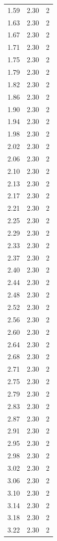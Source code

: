 \begin{longtable}{lrr}
  1.59 & 2.30 & 2 \\
  1.63 & 2.30 & 2 \\
  1.67 & 2.30 & 2 \\
  1.71 & 2.30 & 2 \\
  1.75 & 2.30 & 2 \\
  1.79 & 2.30 & 2 \\
  1.82 & 2.30 & 2 \\
  1.86 & 2.30 & 2 \\
  1.90 & 2.30 & 2 \\
  1.94 & 2.30 & 2 \\
  1.98 & 2.30 & 2 \\
  2.02 & 2.30 & 2 \\
  2.06 & 2.30 & 2 \\
  2.10 & 2.30 & 2 \\
  2.13 & 2.30 & 2 \\
  2.17 & 2.30 & 2 \\
  2.21 & 2.30 & 2 \\
  2.25 & 2.30 & 2 \\
  2.29 & 2.30 & 2 \\
  2.33 & 2.30 & 2 \\
  2.37 & 2.30 & 2 \\
  2.40 & 2.30 & 2 \\
  2.44 & 2.30 & 2 \\
  2.48 & 2.30 & 2 \\
  2.52 & 2.30 & 2 \\
  2.56 & 2.30 & 2 \\
  2.60 & 2.30 & 2 \\
  2.64 & 2.30 & 2 \\
  2.68 & 2.30 & 2 \\
  2.71 & 2.30 & 2 \\
  2.75 & 2.30 & 2 \\
  2.79 & 2.30 & 2 \\
  2.83 & 2.30 & 2 \\
  2.87 & 2.30 & 2 \\
  2.91 & 2.30 & 2 \\
  2.95 & 2.30 & 2 \\
  2.98 & 2.30 & 2 \\
  3.02 & 2.30 & 2 \\
  3.06 & 2.30 & 2 \\
  3.10 & 2.30 & 2 \\
  3.14 & 2.30 & 2 \\
  3.18 & 2.30 & 2 \\
  3.22 & 2.30 & 2 \\

\end{longtable}
